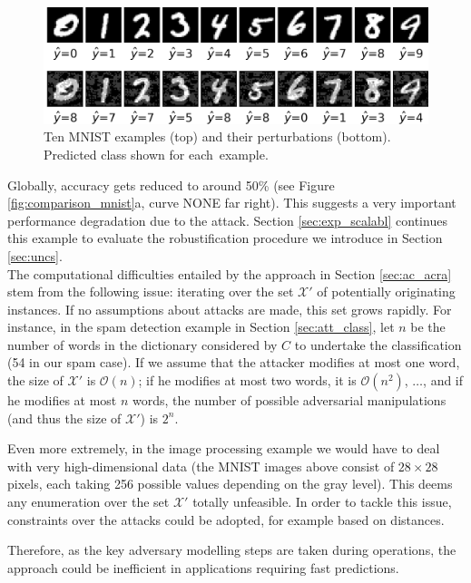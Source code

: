 \begin{figure}[H]
\centering
  \includegraphics[scale=1.]{figures/10samples.png}
  \caption{Ten MNIST examples (top) and their perturbations (bottom). Predicted class shown for each~example.}
  \label{fig:10samples}
\end{figure}
Globally, accuracy gets reduced to around 50\% (see Figure \ref{fig:comparison_mnist}a, curve NONE far right). This suggests a very important performance degradation due to the attack. Section \ref{sec:exp_scalabl} continues this example to evaluate the robustification procedure we introduce in Section  \ref{sec:uncs}. \\

The computational difficulties entailed by 
the approach in Section \ref{sec:ac_acra} stem from the following issue:
iterating over the set $\mathcal{X}'$ of potentially
originating instances.  
 If no assumptions about attacks are made, this set grows rapidly.
 For instance, in the spam detection example in Section \ref{sec:att_class}, 
 let $n$ be the number of words in the dictionary considered by
 $C$ to undertake the classification (54 in our spam case). If 
 we assume that the attacker modifies at most one word,
 the size of $\mathcal{X}'$ is $\mathcal{O}(n)$; if he modifies at most two words, it is $\mathcal{O}(n^2)$, $\dots$, and 
 if he modifies at most $n$ words, 
 the number of possible adversarial manipulations (and thus the size of $\mathcal{X}'$) is $2^n$.
 
   Even more extremely, in the 
 image processing example we would have to deal with
 very high-dimensional data (the MNIST images above consist of $28 \times 28$ pixels, each taking 256 possible values depending on the gray level). 
 This deems any enumeration over the set $\mathcal{X}'$ totally unfeasible. In order to tackle this issue,
 constraints over the attacks could be adopted, for example 
 based on distances.
 
  
 Therefore, as the key adversary modelling steps are taken during operations,
 the approach could be inefficient in applications requiring fast predictions.
  
